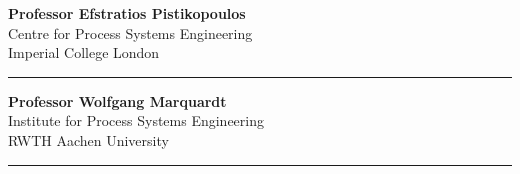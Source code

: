 
\vspace*{-2.0cm} \thispagestyle{empty}
\begin{minipage}[b]{17cm}
\begin{minipage}[b]{8.5cm}
\end{minipage}
\hfill
\begin{minipage}[b]{7.5cm}
	\begin{flushright}
		\begin{flushleft}
			\textcolor{CPSEBlue}{
			\textbf{Professor Efstratios Pistikopoulos} \\ Centre for Process Systems Engineering \\ Imperial College London}
		\end{flushleft}
	\end{flushright}
\end{minipage}
\end{minipage}
\rule{\textwidth}{0.5pt}

\begin{minipage}[b]{8.5cm}
	\begin{flushleft}
	\end{flushleft}
\end{minipage}
\hfill
\begin{minipage}[b]{7.5cm}
	\begin{flushleft}
		\textcolor{AVTDarkBlue}{
		\textbf{Professor Wolfgang Marquardt} \\ Institute for Process Systems Engineering \\ RWTH Aachen University}
	\end{flushleft}
\end{minipage}
\rule{\textwidth}{0.5pt}

